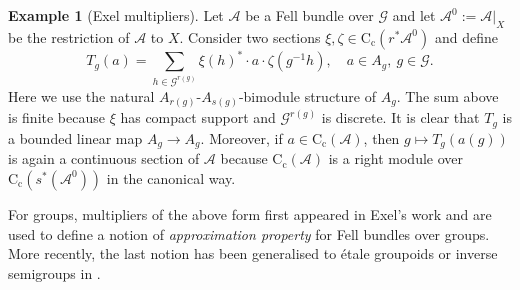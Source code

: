 \documentclass[11 pt, leqno]{amsart}
\numberwithin{equation}{section}
\theoremstyle{plain}
\theoremstyle{definition}
\newtheorem {rem} [thm]{Remark}
\newtheorem{ex}[thm]{Example}
\newcommand*{\contc}{\mathrm{C_c}}%
\newcommand{\B}{\mathcal B}
\newcommand{\G}{\mathcal G} %
\newcommand{\A}{\mathcal A}
\newcommand{\cst}{\ifmmode\mathrm{C}^*\else{$\mathrm{C}^*$}\fi}
\begin{document}
\begin{ex}[Exel multipliers]\label{ex:Alcides_approximation_property_general}
Let $\A$ be a Fell bundle over $\G$ and let $\A^0:=\A|_{X}$ be the restriction of $\A$ to $X$. 
Consider two sections $\xi,\zeta\in \contc(r^*\A^0)$
and define
\[
    T_g(a) = \sum_{h\in \G^{r(g)}}\xi(h)^*\cdot a\cdot\zeta(g^{-1}h),\quad a\in A_g ,\ g \in \G.
\]
Here we use the natural $A_{r(g)}$-$A_{s(g)}$-bimodule structure of $A_g$. 
The sum above is finite because $\xi$ has compact support and $\G^{r(g)}$ is discrete. 
It is clear that $T_g$ is a bounded linear map $A_g\to A_g$.
Moreover, if $a\in \contc(\A)$, then $g\mapsto T_g(a(g))$ is again a continuous section of $\A$ because $\contc(\A)$ is a right module over $\contc(s^*(\A^0))$ in the canonical way.

For groups, multipliers of the above form first appeared in Exel's work \cite{Exel:amenability} and are used to define a notion of \emph{approximation property} for Fell bundles over groups. 
More recently, the last notion has been generalised to \'{e}tale groupoids or inverse semigroups in \cite{Kranz,BussMartinez}. 
\end{ex}

\end{document}
